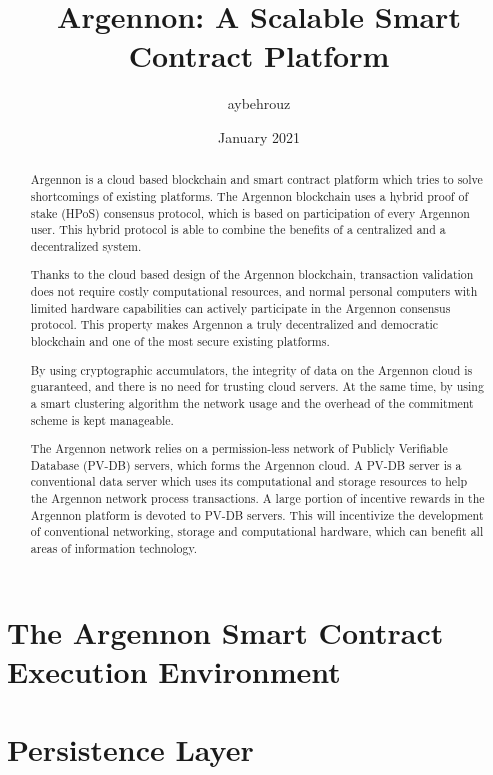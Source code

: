 \documentclass[11pt, a4paper]{report}
\title{Argennon: A Scalable Smart Contract Platform}
\author{aybehrouz}
\date{January 2021}
\begin{document}
    \maketitle
    \begin{abstract}
        Argennon is a cloud based blockchain and smart
        contract platform which tries to solve shortcomings of existing platforms. The Argennon blockchain uses a hybrid
        proof of stake (HPoS) consensus protocol, which is based on participation of every Argennon user. This hybrid
        protocol is able to combine the benefits of a centralized and a decentralized system.

        Thanks to the cloud based design of the Argennon blockchain, transaction validation does not require costly
        computational resources, and normal personal computers with limited hardware capabilities can actively
        participate in the Argennon consensus protocol. This property makes Argennon a truly decentralized and
        democratic blockchain and one of the most secure existing platforms.

        By using cryptographic accumulators, the integrity of data on the Argennon cloud is guaranteed, and there
        is no need for trusting cloud servers. At the same time, by using a smart clustering algorithm the network usage
        and the overhead of the commitment scheme is kept manageable.

        The Argennon network relies on a permission-less network of Publicly Verifiable Database (PV-DB) servers,
        which forms the Argennon cloud. A PV-DB server is a conventional data server which uses its computational and
        storage resources to help the Argennon network process transactions. A large portion of incentive rewards in
        the Argennon platform is devoted to PV-DB servers. This will incentivize the development of conventional
        networking, storage and computational hardware, which can benefit all areas of information technology.
    \end{abstract}
    \tableofcontents


    \chapter{The Argennon Smart Contract Execution Environment}\label{ch:AVM}
    


    \chapter{Persistence Layer}\label{ch:persistance}
    
\end{document}
